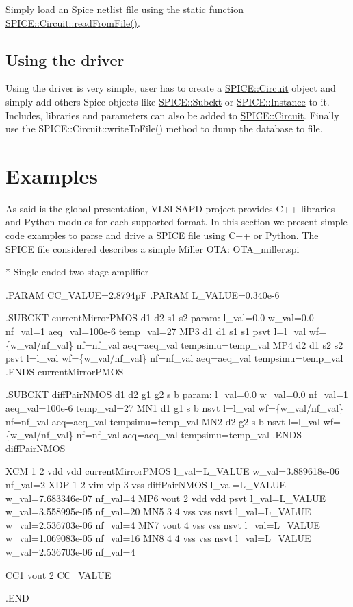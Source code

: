 Simply load an Spice netlist file using the static function \mbox{\hyperlink{class_s_p_i_c_e_1_1_circuit_aa8294fe7d9ceddb5653d08ecae3eaf36}{S\+P\+I\+C\+E\+::\+Circuit\+::read\+From\+File()}}.\hypertarget{spice_spiceDriver}{}\subsection{Using the driver}\label{spice_spiceDriver}
Using the driver is very simple, user has to create a \mbox{\hyperlink{class_s_p_i_c_e_1_1_circuit}{S\+P\+I\+C\+E\+::\+Circuit}} object and simply add others Spice objects like \mbox{\hyperlink{class_s_p_i_c_e_1_1_subckt}{S\+P\+I\+C\+E\+::\+Subckt}} or \mbox{\hyperlink{class_s_p_i_c_e_1_1_instance}{S\+P\+I\+C\+E\+::\+Instance}} to it. Includes, libraries and parameters can also be added to \mbox{\hyperlink{class_s_p_i_c_e_1_1_circuit}{S\+P\+I\+C\+E\+::\+Circuit}}. Finally use the S\+P\+I\+C\+E\+::\+Circuit\+::write\+To\+File() method to dump the database to file.\hypertarget{spice_spiceExamples}{}\section{Examples}\label{spice_spiceExamples}
As said is the global presentation, V\+L\+SI S\+A\+PD project provides C++ libraries and Python modules for each supported format. In this section we present simple code examples to parse and drive a S\+P\+I\+CE file using C++ or Python. The S\+P\+I\+CE file considered describes a simple Miller O\+TA\+: {\ttfamily O\+T\+A\+\_\+miller.\+spi} 
\begin{DoxyCodeInclude}
* Single-ended two-stage amplifier

.PARAM CC\_VALUE=2.8794pF
.PARAM L\_VALUE=0.340e-6

.SUBCKT currentMirrorPMOS d1 d2 s1 s2 param: l\_val=0.0 w\_val=0.0 nf\_val=1 aeq\_val=100e-6 temp\_val=27
MP3 d1 d1 s1 s1 psvt l=l\_val wf=\{w\_val/nf\_val\}  nf=nf\_val  aeq=aeq\_val tempsimu=temp\_val
MP4 d2 d1 s2 s2 psvt l=l\_val wf=\{w\_val/nf\_val\}  nf=nf\_val  aeq=aeq\_val tempsimu=temp\_val
.ENDS currentMirrorPMOS

.SUBCKT diffPairNMOS d1 d2 g1 g2 s b param: l\_val=0.0 w\_val=0.0 nf\_val=1 aeq\_val=100e-6 temp\_val=27
MN1 d1 g1 s b nsvt l=l\_val wf=\{w\_val/nf\_val\}  nf=nf\_val  aeq=aeq\_val tempsimu=temp\_val
MN2 d2 g2 s b nsvt l=l\_val wf=\{w\_val/nf\_val\}  nf=nf\_val  aeq=aeq\_val tempsimu=temp\_val
.ENDS diffPairNMOS

XCM   1    2   vdd vdd         currentMirrorPMOS  l\_val=L\_VALUE  w\_val=3.889618e-06  nf\_val=2
XDP   1    2   vim vip 3   vss diffPairNMOS       l\_val=L\_VALUE  w\_val=7.683346e-07  nf\_val=4
MP6   vout 2   vdd vdd         psvt               l\_val=L\_VALUE  w\_val=3.558995e-05  nf\_val=20
MN5   3    4   vss vss         nsvt               l\_val=L\_VALUE  w\_val=2.536703e-06  nf\_val=4 
MN7   vout 4   vss vss         nsvt               l\_val=L\_VALUE  w\_val=1.069083e-05  nf\_val=16
MN8   4    4   vss vss         nsvt               l\_val=L\_VALUE  w\_val=2.536703e-06  nf\_val=4 

CC1   vout 2   CC\_VALUE

.END
\end{DoxyCodeInclude}


